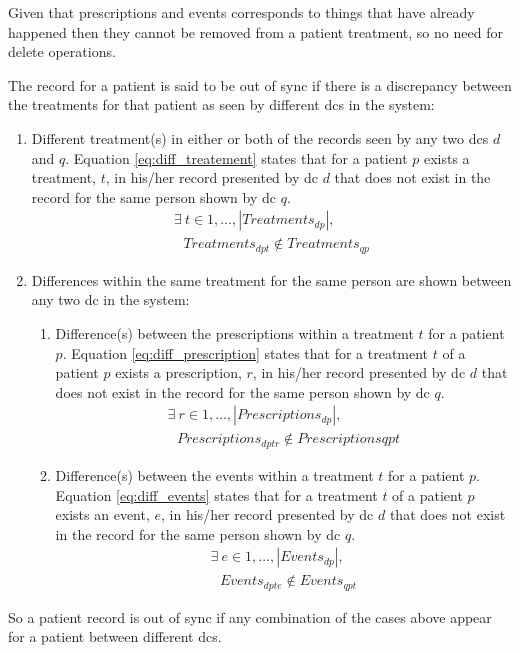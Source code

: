 Given that prescriptions and events corresponds to things that have already happened then they cannot be removed from a patient treatment, so no need for delete operations.

The record for a patient is said to be out of sync if there is a discrepancy between the treatments for that patient as seen by different \glspl{dc} in the system:
\begin{enumerate}
	\item Different treatment(s) in either or both of the records seen by any two \glspl{dc} $d$ and $q$. Equation \ref{eq:diff_treatement} states that for a patient $p$ exists a treatment, $t$, in his/her record presented by \gls{dc} $d$ that does not exist in the record for the same person shown by \gls{dc} $q$.
		\begin{multline} \label{eq:diff_treatement}
			\exists ~ t \in {1,\dots, |Treatments_{dp}|}, \\ \text{  } Treatments_{dpt} \not\in Treatments_{qp}
		\end{multline}
	\item Differences within the same treatment for the same person are shown between any two \gls{dc} in the system:
		\begin{enumerate}
			\item Difference(s) between the prescriptions within a treatment $t$ for a patient $p$. Equation \ref{eq:diff_prescription} states that for a treatment $t$ of a patient $p$ exists a prescription, $r$, in his/her record presented by \gls{dc} $d$ that does not exist in the record for the same person shown by \gls{dc} $q$.
				\begin{multline} \label{eq:diff_prescription}
					\exists ~ r \in {1,\dots, |Prescriptions_{dp}|}, \\ \text{  } Prescriptions_{dptr} \not\in Prescriptions{qpt}
				\end{multline}
			\item Difference(s) between the events within a treatment $t$ for a patient $p$. Equation \ref{eq:diff_events} states that for a treatment $t$ of a patient $p$ exists an event, $e$, in his/her record presented by \gls{dc} $d$ that does not exist in the record for the same person shown by \gls{dc} $q$.
				\begin{multline} \label{eq:diff_events}
					\exists ~ e \in {1,\dots, |Events_{dp}|}, \\ \text{  } Events_{dpte} \not\in Events_{qpt}
				\end{multline}
		\end{enumerate}
\end{enumerate}

So a patient record is out of sync if any combination of the cases above appear for a patient between different \glspl{dc}.
